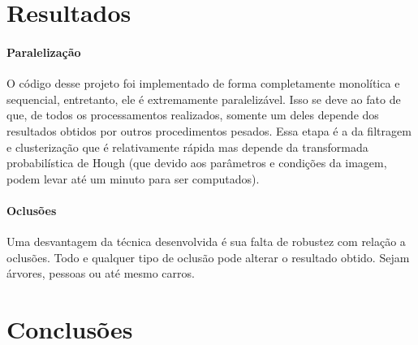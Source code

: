 \documentclass[10pt,twocolumn,letterpaper]{article}
\begin{document}
\section{Resultados}

\paragraph{Paralelização}
	O código desse projeto foi implementado de forma completamente monolítica e sequencial,
entretanto, ele é extremamente paralelizável. Isso se deve ao fato de que, de todos os processamentos
realizados, somente um deles depende dos resultados obtidos por outros procedimentos pesados.
Essa etapa é a da filtragem e clusterização que é relativamente rápida mas depende da transformada
probabilística de Hough (que devido aos parâmetros e condições da imagem, podem levar até um minuto
para ser computados).

\paragraph{Oclusões}
	Uma desvantagem da técnica desenvolvida é sua falta de robustez com relação a oclusões.
Todo e qualquer tipo de oclusão pode alterar o resultado obtido. Sejam árvores, pessoas ou até
mesmo carros. 


\section{Conclusões}









{\small


}
\end{document}
